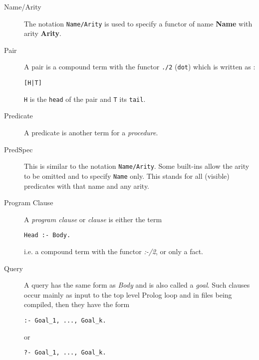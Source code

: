 \begin{description}
\item[Name/Arity]
The notation {\tt Name/Arity} is used to specify a functor of name 
{\bf Name} with arity {\bf Arity}.

\item[Pair]
A pair is a compound term with the functor {\tt ./2} ({\tt dot})
which is written as :
\begin{verbatim}
[H|T]
\end{verbatim}
{\tt H} is the {\tt head} of the pair and {\tt T} its {\tt tail}.

%
\item[Predicate]
A predicate is another term for a {\it procedure}.

\item[PredSpec]
This is similar to the notation {\tt Name/Arity}.
Some built-ins allow the arity to be omitted and to specify
{\tt Name} only.
This stands for all (visible) predicates with that name and any arity.

\item[Program Clause]
A {\it program clause} or {\it clause} is either the term
\begin{verbatim}
Head :- Body.
\end{verbatim}
i.e. a compound term with the functor {\it :-/2}, or only a fact.

\item[Query]
A query  has the same form as {\it Body} 	
and is also called a {\it goal}.
Such clauses occur mainly as input to the top level Prolog loop
and in files being compiled, then they have the form
\begin{verbatim}
:- Goal_1, ..., Goal_k.
\end{verbatim}
or
\begin{verbatim}
?- Goal_1, ..., Goal_k.
\end{verbatim}


\end{description}
